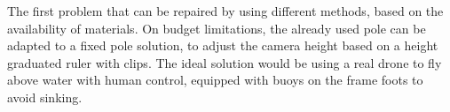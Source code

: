     The first problem that can be repaired by using different methods, based on the availability of materials. On budget limitations, the already used pole can be adapted to a fixed pole solution, to adjust the camera height based on a height graduated ruler with clips. The ideal solution would be using a real drone to fly above water with human control, equipped with buoys on the frame foots to avoid sinking.
    
